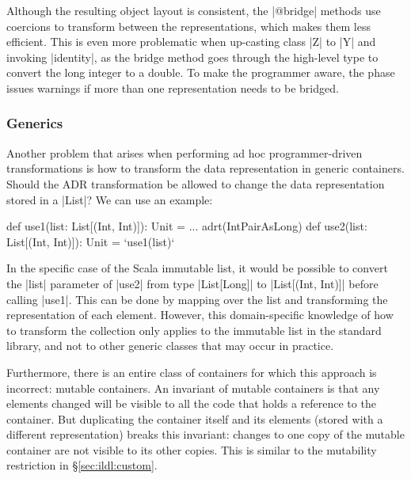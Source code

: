 Although the resulting object layout is consistent, the |@bridge| methods use coercions to transform between the representations, which makes them less efficient. This is even more problematic when up-casting class |Z| to |Y| and invoking |identity|, as the bridge method goes through the high-level type to convert the long integer to a double. To make the programmer aware, the \bridge{} phase issues warnings if more than one representation needs to be bridged.

\subsubsection{Generics}
\label{sec:ildl:language-generics}
Another problem that arises when performing ad hoc programmer-driven transformations is how to transform the data representation in generic containers. Should the ADR transformation be allowed to change the data representation stored in a |List|? We can use an example:

\begin{lstlisting-nobreak}
def use1(list: List[(Int, Int)]): Unit = ...
adrt(IntPairAsLong) {
  def use2(list: List[(Int, Int)]): Unit = `use1(list)`
}
\end{lstlisting-nobreak}

In the specific case of the Scala immutable list, it would be possible to convert the |list| parameter of |use2| from type |List[Long]| to |List[(Int, Int)]| before calling |use1|. This can be done by mapping over the list and transforming the representation of each element. However, this domain-specific knowledge of how to transform the collection only applies to the immutable list in the standard library, and not to other generic classes that may occur in practice.

Furthermore, there is an entire class of containers for which this approach is incorrect: mutable containers. An invariant of mutable containers is that any elements changed will be visible to all the code that holds a reference to the container. But duplicating the container itself and its elements (stored with a different representation) breaks this invariant: changes to one copy of the mutable container are not visible to its other copies. This is similar to the mutability restriction in \S\ref{sec:ildl:custom}.

